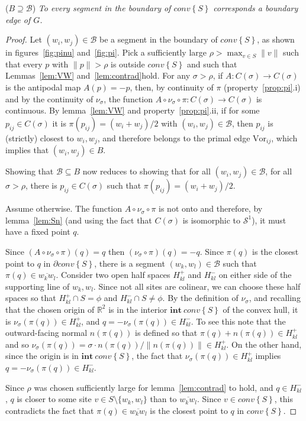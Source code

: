 \documentclass[11pt]{article}
\newcommand{\Sites}{S}
\newcommand{\Vor}{\text{Vor}}
\newcommand{\CHS}{{conv}\left\{\Sites\right\}}
\begin{document}
($B\supseteq\mathcal{B}$)
\emph{
To every segment  in the boundary of $\CHS$ corresponds a boundary edge of $G$.  
}
\begin{proof}  
Let $(w_i,w_j)\in\mathcal{B}$ be a segment in the boundary of $\CHS$, 
	as shown in figures~\ref{fig:pinu} and~\ref{fig:pi}. 
Pick a sufficiently large $\rho > \max_{v\in \Sites}\|v\|$ such that every $p$ with
$\|p\| > \rho$ is outside $\CHS$ and such that 
	Lemmas~\ref{lem:VW} and~\ref{lem:contrad}hold. 
For any $\sigma > \rho$, if $A:C(\sigma)\rightarrow C(\sigma)$ is the antipodal map $A(p) = -p$, 
then, by continuity of $\pi$ (property~\ref{prop:pi}.i) and by the continuity of $\nu_\sigma$, the function $A\circ\nu_\sigma\circ\pi:C(\sigma)\rightarrow C(\sigma)$ is
continuous. 
By lemma~\ref{lem:VW} and property~\ref{prop:pi}.ii, 
	if for some $p_{ij}\in C(\sigma)$ it is 
$\pi(p_{ij})= (w_i+w_j)/2$ with
$(w_i,w_j)\in\mathcal{B}$, then $p_{ij}$ is (strictly) closest to
$w_i,w_j$, and therefore belongs to the primal edge $\Vor_{ij}$, which implies
that $(w_i,w_j)\in B$. 

Showing that $\mathcal{B}\subseteq B$ now reduces to showing that for all 
$(w_i,w_j)\in\mathcal{B}$, for all $\sigma > \rho$, there is $p_{ij}\in
C(\sigma)$ such that
$\pi(p_{ij})= (w_i+w_j)/2$. 

Assume otherwise. The function 
$A\circ\nu_\sigma\circ\pi$ is not onto and therefore, 
by lemma~\ref{lem:Sn} (and using the fact that $C(\sigma)$ is isomorphic to $\mathcal{S}^1$), 
it must have a fixed point $q$. 

Since $(A\circ\nu_\sigma\circ\pi)(q) = q$ then $(\nu_\sigma\circ\pi)(q) = -q$. 
Since $\pi(q)$ is the closest point to $q$ in $\partial\CHS$, 
	there is a segment $(w_k,w_l)\in\mathcal{B}$ such that
$\pi(q)\in\overline{w_k w_l}$. Consider two open half spaces
$H^{+}_{kl}$ and $H^{-}_{kl}$ on either side of the supporting line of
$w_k,w_l$. Since not all sites are colinear, we can choose these half spaces so that 
$H^{+}_{kl}\cap \Sites=\phi$ and $H^{-}_{kl}\cap \Sites \neq \phi$. 
By the definition of $\nu_\sigma$, and recalling that the chosen origin of
$\mathbb{R}^2$ is in the interior $\mathbf{int\ }{\CHS}$ of the convex hull, 
it is $\nu_\sigma(\pi(q))\in H^{+}_{kl}$, and $q=-\nu_\sigma(\pi(q))\in H^{-}_{kl}$. 
To see this note that the outward-facing normal $n(\pi(q))$ is defined so that
$\pi(q)+n(\pi(q))\in H^{+}_{kl}$ and so $\nu_\sigma(\pi(q)) = \sigma\cdot n(\pi(q)) / \|n(\pi(q))\| \in  H^{+}_{kl}$.
On the other hand, since the origin is in
$\mathbf{int\ }{\CHS}$, the fact that $\nu_\sigma(\pi(q))\in H^{+}_{kl}$ 
implies $q=-\nu_\sigma(\pi(q))\in  H^{-}_{kl}$. 

Since $\rho$ was chosen sufficiently large for lemma~\ref{lem:contrad} to
hold, and $q\in  H^{-}_{kl}$, $q$ is closer to some site $v\in
\Sites\setminus\{w_k,w_l\}$ than to $\overline{w_k w_l}$. 
Since $v\in\CHS$, this contradicts the fact
that $\pi(q)\in\overline{w_k w_l}$ is the closest point to $q$ in
$\CHS$. \end{proof}
\end{document}
